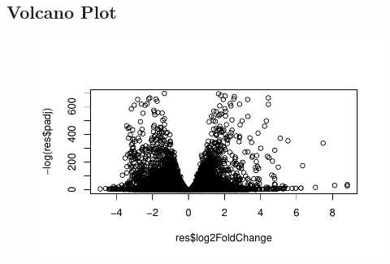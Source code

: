 \documentclass[
  letterpaper,
  DIV=11,
  numbers=noendperiod]{scrartcl}
\newenvironment{Shaded}{\begin{snugshade}}{\end{snugshade}}
\newcommand{\CommentTok}[1]{\textcolor[rgb]{0.37,0.37,0.37}{#1}}
\newcommand{\FunctionTok}[1]{\textcolor[rgb]{0.28,0.35,0.67}{#1}}
\newcommand{\NormalTok}[1]{\textcolor[rgb]{0.00,0.23,0.31}{#1}}
\newcommand{\SpecialCharTok}[1]{\textcolor[rgb]{0.37,0.37,0.37}{#1}}
\begin{document}
\hypertarget{volcano-plot}{%
\subsection{Volcano Plot}\label{volcano-plot}}

\begin{Shaded}
\end{Shaded}

\begin{figure}[H]

{\centering \includegraphics{lab13_files/figure-pdf/unnamed-chunk-9-1.pdf}

}

\end{figure}
\end{document}
